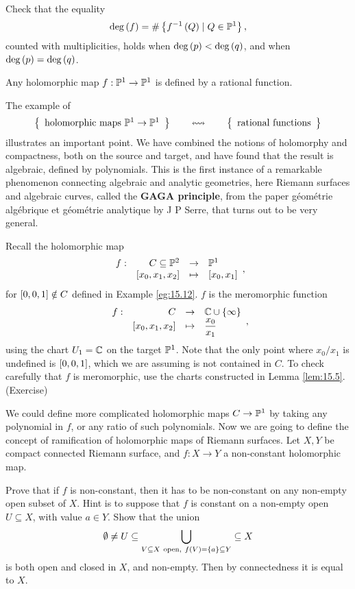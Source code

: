 \begin{exercise}
Check that the equality
$$ \deg\rb{f} = \#\cb{f^{-1}\rb{Q} \mid Q \in \P^1}, $$
counted with multiplicities, holds when $ \deg\rb{p} < \deg\rb{q} $, and when $ \deg\rb{p} = \deg\rb{q} $.
\end{exercise}

\begin{exercise}
Any holomorphic map $ f : \P^1 \to \P^1 $ is defined by a rational function.
\end{exercise}

\begin{remark}
The example of
$$ \correspondence{\text{holomorphic maps} \ \P^1 \to \P^1}{\text{rational functions}} $$
illustrates an important point. We have combined the notions of holomorphy and compactness, both on the source and target, and have found that the result is algebraic, defined by polynomials. This is the first instance of a remarkable phenomenon connecting algebraic and analytic geometries, here Riemann surfaces and algebraic curves, called the \textbf{GAGA principle}, from the paper g\'eom\'etrie alg\'ebrique et g\'eom\'etrie analytique by J P Serre, that turns out to be very general.
\end{remark}

\begin{example}
Recall the holomorphic map
$$ \function[f]{C \subseteq \P^2}{\P^1}{\sb{x_0, x_1, x_2}}{\sb{x_0, x_1}}, $$
for $ \sb{0, 0, 1} \notin C $ defined in Example \ref{eg:15.12}. $ f $ is the meromorphic function
$$ \function[f]{C}{\C \cup \cb{\infty}}{\sb{x_0, x_1, x_2}}{\dfrac{x_0}{x_1}}, $$
using the chart $ U_1 = \C $ on the target $ \P^1 $. Note that the only point where $ x_0 / x_1 $ is undefined is $ \sb{0, 0, 1} $, which we are assuming is not contained in $ C $. To check carefully that $ f $ is meromorphic, use the charts constructed in Lemma \ref{lem:15.5}. (Exercise)
\end{example}


We could define more complicated holomorphic maps $ C \to \P^1 $ by taking any polynomial in $ f $, or any ratio of such polynomials. Now we are going to define the concept of ramification of holomorphic maps of Riemann surfaces. Let $ X, Y $ be compact connected Riemann surface, and $ f : X \to Y $ a non-constant holomorphic map.

\begin{exercise}
\label{ex:48}
Prove that if $ f $ is non-constant, then it has to be non-constant on any non-empty open subset of $ X $. Hint is to suppose that $ f $ is constant on a non-empty open $ U \subseteq X $, with value $ a \in Y $. Show that the union
$$ \emptyset \ne U \subseteq \bigcup_{V \subseteq X \ \text{open}, \ f\rb{V} = \cb{a} \subseteq Y} \subseteq X $$
is both open and closed in $ X $, and non-empty. Then by connectedness it is equal to $ X $.
\end{exercise}

